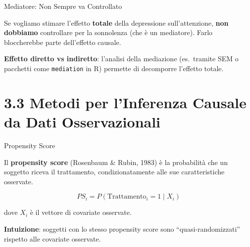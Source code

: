\documentclass[
  ignorenonframetext,
]{beamer}
\begin{document}
\begin{frame}{Mediatore: Non Sempre va Controllato}
\label{mediatore-non-sempre-va-controllato}
\begin{center}
\end{center}
\vspace{-0.3em}

\small Se vogliamo stimare l'effetto \textbf{totale} della depressione
sull'attenzione, \textbf{non dobbiamo} controllare per la sonnolenza
(che è un mediatore). Farlo bloccherebbe parte dell'effetto causale.

\vspace{0.3em}

\footnotesize \textbf{Effetto diretto vs indiretto}: l'analisi della
mediazione (es.~tramite SEM o pacchetti come \texttt{mediation} in R)
permette di decomporre l'effetto totale.
\end{frame}

\section{3.3 Metodi per l'Inferenza Causale da Dati
Osservazionali}\label{metodi-per-linferenza-causale-da-dati-osservazionali}

\begin{frame}{Propensity Score}
\label{propensity-score}
\small

Il \textbf{propensity score} (Rosenbaum \& Rubin, 1983) è la probabilità
che un soggetto riceva il trattamento, condizionatamente alle sue
caratteristiche osservate.

\[PS_i = P(\text{Trattamento}_i = 1 \mid X_i)\]

dove \(X_i\) è il vettore di covariate osservate.

\vspace{0.4em}

\textbf{Intuizione}: soggetti con lo stesso propensity score sono
``quasi-randomizzati'' rispetto alle covariate osservate.

\vspace{0.4em}
\end{frame}
\end{document}

